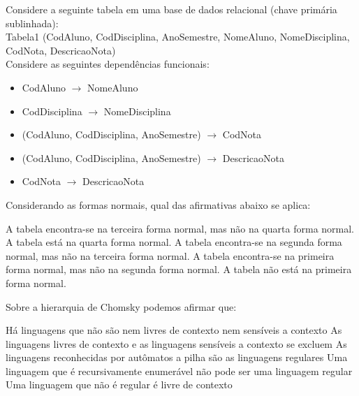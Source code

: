 \documentclass[12pt, addpoints]{exam}
\begin{document}
\begin{questions}
\question

Considere a seguinte tabela em uma base de dados relacional (chave primária sublinhada):\\

Tabela1 (CodAluno, CodDisciplina, AnoSemestre, NomeAluno, NomeDisciplina, CodNota, DescricaoNota)\\

Considere as seguintes dependências funcionais:

\begin{itemize}

    \item CodAluno \(\rightarrow\) NomeAluno

    \item CodDisciplina \(\rightarrow\) NomeDisciplina

    \item (CodAluno, CodDisciplina, AnoSemestre) \(\rightarrow\) CodNota

    \item (CodAluno, CodDisciplina, AnoSemestre) \(\rightarrow\) DescricaoNota

    \item CodNota \(\rightarrow\) DescricaoNota

\end{itemize}



Considerando as formas normais, qual das afirmativas abaixo se aplica:
\begin{choices}
\choice A tabela encontra-se na terceira forma normal, mas não na quarta forma normal.
\choice A tabela está na quarta forma normal.
\choice A tabela encontra-se na segunda forma normal, mas não na terceira forma normal.
\choice A tabela encontra-se na primeira forma normal, mas não na segunda forma normal.
\choice A tabela não está na primeira forma normal.
\end{choices}

\question

Sobre a hierarquia de Chomsky podemos afirmar que:
\begin{choices}
\choice Há linguagens que não são nem livres de contexto nem sensíveis a contexto
\choice As linguagens livres de contexto e as linguagens sensíveis a contexto se excluem
\choice As linguagens reconhecidas por autômatos a pilha são as linguagens regulares
\choice Uma linguagem que é recursivamente enumerável não pode ser uma linguagem regular
\choice Uma linguagem que não é regular é livre de contexto
\end{choices}


\end{questions}
\end{document}
